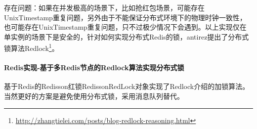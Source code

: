 \documentclass[../../../interview-questions.tex]{subfiles}
\begin{document}
存在问题：如果在并发极高的场景下，比如抢红包场景，可能存在UnixTimestamp重复问题，另外由于不能保证分布式环境下的物理时钟一致性，也可能存在UnixTimestamp重复问题，只不过极少情况下会遇到。以上实现仅在单实例的场景下是安全的，针对如何实现分布式Redis的锁，antirez提出了分布式锁算法Redlock\footnote{\url{http://zhangtielei.com/posts/blog-redlock-reasoning.html}}。

\paragraph{Redis实现-基于多Redis节点的Redlock算法实现分布式锁}

基于Redis的Redisson红锁RedissonRedLock对象实现了Redlock介绍的加锁算法。当然更好的方案是避免使用分布式锁，采用消息队列替代。
\end{document}
